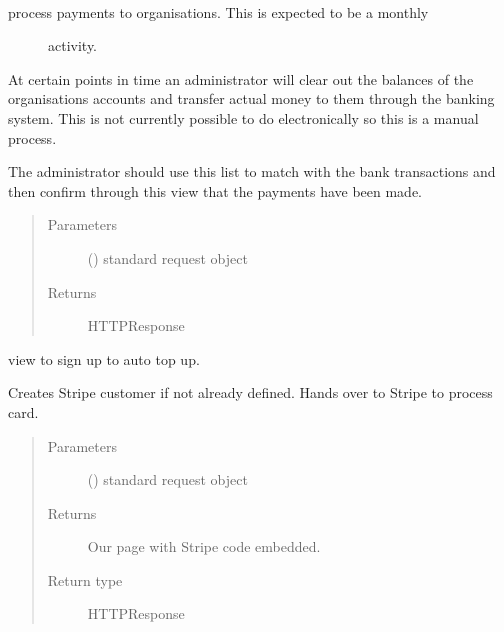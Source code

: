 \documentclass[letterpaper,10pt,english]{sphinxmanual}
\begin{document}
\begin{fulllineitems}
\label{\detokenize{payments:payments.views.settlement}}~\begin{description}
\item[{process payments to organisations. This is expected to be a monthly}] \leavevmode
activity.

\end{description}

At certain points in time an administrator will clear out the balances of
the organisations accounts and transfer actual money to them through the
banking system. This is not currently possible to do electronically so this
is a manual process.

The administrator should use this list to match with the bank transactions and
then confirm through this view that the payments have been made.
\begin{quote}\begin{description}
\item[{Parameters}] \leavevmode
{} () \textendash{} standard request object

\item[{Returns}] \leavevmode
HTTPResponse

\end{description}\end{quote}

\end{fulllineitems}


\begin{fulllineitems}
\label{\detokenize{payments:payments.views.setup_autotopup}}
view to sign up to auto top up.

Creates Stripe customer if not already defined.
Hands over to Stripe to process card.
\begin{quote}\begin{description}
\item[{Parameters}] \leavevmode
{} () \textendash{} standard request object

\item[{Returns}] \leavevmode
Our page with Stripe code embedded.

\item[{Return type}] \leavevmode
HTTPResponse

\end{description}\end{quote}

\end{fulllineitems}
\end{document}
